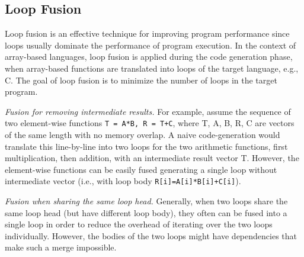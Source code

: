 

\subsection{Loop Fusion}

Loop fusion is an effective technique for improving program performance since
loops usually dominate the performance of program execution.
In the context of array-based languages, loop fusion is applied during the code generation phase, when array-based functions are translated into loops of the target language, e.g., C. The goal of loop fusion is to minimize the number of loops in the target program. 

\textit{Fusion for removing intermediate results.}
For example, assume the sequence of two element-wise functions  \texttt{T = A*B, R = T+C}, where T, A, B, R, C are vectors of the same length with no memory overlap.  A naive code-generation would translate this line-by-line into two loops for the two
arithmetic functions, first multiplication, then addition, with an intermediate result vector T. However, the element-wise functions can be easily fused generating a single loop without intermediate vector (i.e., with loop body \texttt{R[i]=A[i]*B[i]+C[i]}). 

\textit{Fusion when sharing the same loop head.}
Generally, when two loops share the same loop head (but have different loop body), they often can be fused into a single loop in order to reduce the overhead of iterating over the two loops individually. However, the bodies of the two loops might have dependencies that make such a merge impossible. 




